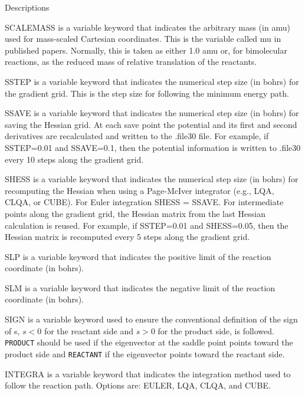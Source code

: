   Descriptions

    SCALEMASS is a variable keyword that indicates the arbitrary
              mass (in amu) used for mass-scaled Cartesian coordinates. 
              This is the variable called mu in published papers.  Normally,
              this is taken as either 1.0 amu or, for bimolecular reactions,
              as the reduced mass of relative translation of the reactants.
      
    SSTEP is a variable keyword that indicates the numerical step
              size (in bohrs) for the gradient grid.  This is the step
              size for following the minimum energy path.

    SSAVE is a variable keyword that indicates the numerical step
              size (in bohrs) for saving the Hessian grid. At each
              save point the potential and its first and second
              derivatives are recalculated and written to the .file30
              file. For example, if SSTEP=0.01 and SSAVE=0.1, then the
              potential information is written to .file30 every 10
              steps along the gradient grid.

    SHESS is a variable keyword that indicates the numerical step
              size (in bohrs) for recomputing the Hessian when using a
              Page-McIver integrator (e.g., LQA, CLQA, or CUBE).  For
              Euler integration SHESS = SSAVE. For intermediate points
              along the gradient grid, the Hessian matrix from the
              last Hessian calculation is reused.  For example, if
              SSTEP=0.01 and SHESS=0.05, then the Hessian matrix is
              recomputed every 5 steps along the gradient grid.

    SLP is a variable keyword that indicates the positive limit of 
              the reaction coordinate (in bohrs).

    SLM is a variable keyword that indicates the negative limit of 
              the reaction coordinate (in bohrs).

    SIGN is a variable keyword used to ensure the conventional definition
              of the sign of s, $s < 0$ for the reactant side and
              $s > 0$ for the product side, is followed.  \verb+PRODUCT+
              should be used if the eigenvector at the saddle point points
              toward the product side and \verb+REACTANT+ if the
              eigenvector points toward the reactant side.

    INTEGRA is a variable keyword that indicates the integration
              method used to follow the reaction path.  Options are: EULER,
              LQA, CLQA, and CUBE.

